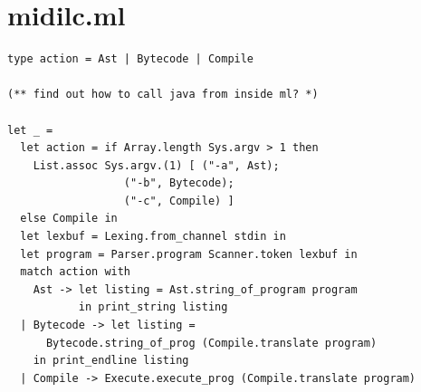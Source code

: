 \documentclass[12pt,A4]{book}
\begin{document}
\section{midilc.ml}
\begin{verbatim}
type action = Ast | Bytecode | Compile

(** find out how to call java from inside ml? *)

let _ =
  let action = if Array.length Sys.argv > 1 then
    List.assoc Sys.argv.(1) [ ("-a", Ast);
			      ("-b", Bytecode);
			      ("-c", Compile) ]
  else Compile in
  let lexbuf = Lexing.from_channel stdin in
  let program = Parser.program Scanner.token lexbuf in
  match action with
    Ast -> let listing = Ast.string_of_program program
           in print_string listing
  | Bytecode -> let listing =
      Bytecode.string_of_prog (Compile.translate program)
    in print_endline listing
  | Compile -> Execute.execute_prog (Compile.translate program)
 
\end{verbatim}
\end{document}
